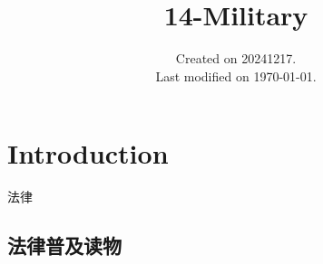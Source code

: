 \documentclass[UTF8]{../ApplicationUniverse}
\begin{document}
\title{14-Military}
\date{Created on 20241217.\\   Last modified on \today.}
\maketitle
\tableofcontents


\chapter{Introduction}
法律

\section{法律普及读物}

\end{document}

